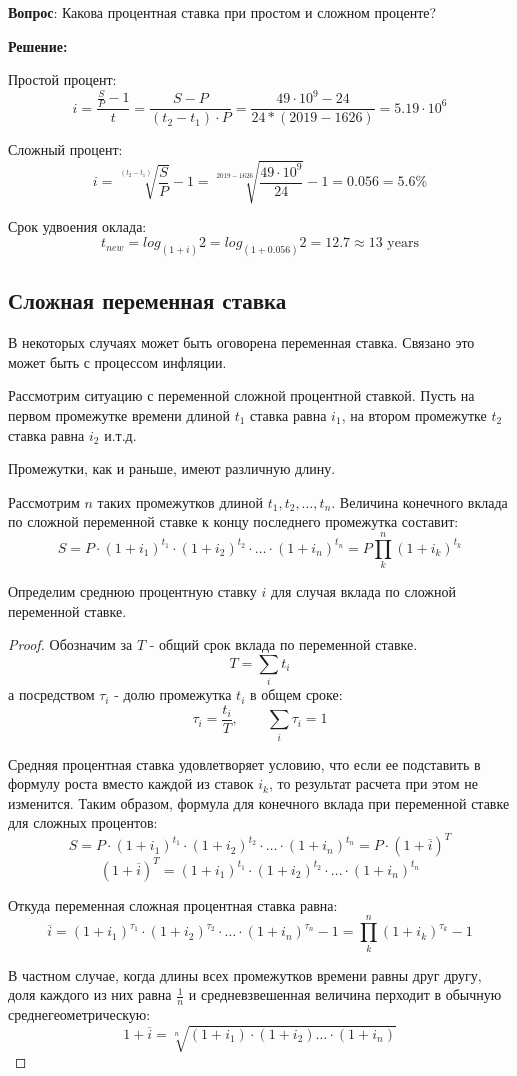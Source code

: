 \documentclass[aps,%
12pt,%
final,%
oneside,
onecolumn,%
musixtex, %
superscriptaddress,%
centertags]{article} %
\theoremstyle{plain}
\theoremstyle{definition}
\theoremstyle{remark}
\begin{document}
\textbf{Вопрос}: Какова процентная ставка при простом и сложном проценте?

\textbf{Решение:}

Простой процент: 
$$i=\frac{\frac{S}{P}-1}{t}=\frac{S-P}{(t_2-t_1)\cdot P}=\frac{49\cdot 10^9-24}{24*(2019-1626)}=5.19 \cdot 10^6$$

Сложный процент: 
$$i=\sqrt[(t_2-t_1)]{\frac{S}{P}}-1=\sqrt[2019-1626]{\frac{49\cdot 10^9}{24}}-1 = 0.056 = 5.6\%$$

Срок удвоения оклада: 
$$t_{new}=log_{(1+i)} 2 = log_{(1+0.056)} 2 = 12.7 \approx 13 \text{ years}$$ 


\subsection{Сложная переменная ставка}

В некоторых случаях может быть оговорена переменная ставка. Связано это может быть с процессом инфляции.

Рассмотрим ситуацию с переменной сложной процентной ставкой. Пусть на первом промежутке времени длиной $t_1$ ставка равна $i_1$, на втором промежутке $t_2$ ставка равна $i_2$ и.т.д.

Промежутки, как и раньше, имеют различную длину.

Рассмотрим $n$ таких промежутков длиной $t_1,t_2,\ldots,t_n$. Величина конечного вклада по сложной переменной ставке к концу последнего промежутка составит:
$$S = P \cdot (1+i_1)^{t_1} \cdot (1+i_2)^{t_2} \cdot \ldots \cdot(1+i_n)^{t_n} = P \prod\limits_k^n (1+i_k)^{t_k}$$

Определим среднюю процентную ставку $i$ для случая вклада по сложной переменной ставке.

\begin{proof}
	Обозначим за $T$ - общий срок вклада по переменной ставке.
	$$ T =  \sum_{i}{t_i} $$
	а посредством $\tau_i$ - долю промежутка $t_i$ в общем сроке:
	$$\tau_i = \frac{t_i}{T}, \qquad \sum_i \tau_i = 1 $$

	Средняя процентная ставка удовлетворяет условию, что если ее подставить в формулу роста вместо каждой из ставок $i_k$, то результат расчета при этом не изменится. Таким образом, формула для конечного вклада при переменной ставке для сложных процентов:
	$$ S = P \cdot (1+i_1)^{t_1} \cdot (1+i_2)^{t_2} \cdot \ldots \cdot(1+i_n)^{t_n} = P\cdot (1+ \overline{i})^T$$
	$$ (1+\overline{i})^T =  (1+i_1)^{t_1} \cdot (1+i_2)^{t_2} \cdot\ldots \cdot(1+i_n)^{t_n}$$

	Откуда переменная сложная процентная ставка равна:
	$$ \overline{i} = (1+i_1)^{\tau_1} \cdot (1+i_2)^{\tau_2} \cdot \ldots \cdot(1+i_n)^{\tau_n} - 1 =  \prod_k^n (1+i_k)^{\tau_k}  - 1$$

	В частном случае, когда длины всех промежутков времени равны друг другу, доля каждого из них равна $\frac{1}{n}$ и средневзвешенная величина перходит в обычную среднегеометрическую:
	$$1+ \overline{i} =  \sqrt[n]{(1+i_1)\cdot (1+i_2)\ldots \cdot(1+i_n)}$$
\end{proof}
\end{document}

